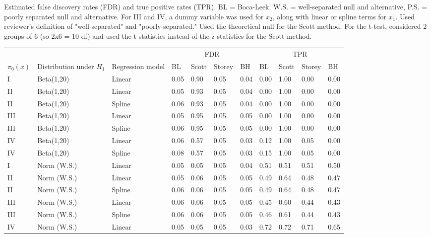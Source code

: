 \documentclass{article}\usepackage[]{graphicx}\usepackage[]{color}
\begin{document}
  
  Estimated false discovery rates (FDR) and true positive rates (TPR). BL = Boca-Leek. W.S. = well-separated null and alternative, P.S. = poorly separated null and alternative. For III and IV, a dummy variable was used for $x_{2}$, along with linear or spline terms for $x_1$. Used reviewer's definition of "well-separated" and "poorly-separated." Used the theoretical null for the Scott method. For the t-test, considered 2 groups of 6 (so 2x6 = 10 df) and used the t-statistics instead of the z-statistics for the Scott method.
\begin{table}[ht]
\centering
\begin{tabular}{lll|llll|llll}
  \hline
  &&& \multicolumn{4}{c}{FDR} & \multicolumn{4}{c}{TPR}\\
 $\pi_0(x)$ &  Distribution under $H_1$ & Regression model & BL & Scott & Storey & BH & BL & Scott & Storey & BH    \\
 \hline
I & Beta(1,20) & Linear & 0.05 & 0.90 & 0.05 & 0.04 & 0.00 & 1.00 & 0.00 & 0.00 \\ 
  II & Beta(1,20) & Linear & 0.05 & 0.93 & 0.05 & 0.04 & 0.00 & 1.00 & 0.00 & 0.00 \\ 
  II & Beta(1,20) & Spline & 0.06 & 0.93 & 0.05 & 0.04 & 0.00 & 1.00 & 0.00 & 0.00 \\ 
  III & Beta(1,20) & Linear & 0.05 & 0.95 & 0.05 & 0.05 & 0.00 & 1.00 & 0.00 & 0.00 \\ 
  III & Beta(1,20) & Spline & 0.06 & 0.95 & 0.05 & 0.05 & 0.00 & 1.00 & 0.00 & 0.00 \\ 
  IV & Beta(1,20) & Linear & 0.06 & 0.57 & 0.05 & 0.03 & 0.12 & 1.00 & 0.05 & 0.00 \\ 
  IV & Beta(1,20) & Spline & 0.08 & 0.57 & 0.05 & 0.03 & 0.15 & 1.00 & 0.05 & 0.00 \\ 
   \hline
I & Norm (W.S.) & Linear & 0.05 & 0.05 & 0.05 & 0.04 & 0.51 & 0.51 & 0.51 & 0.50 \\ 
  II & Norm (W.S.) & Linear & 0.05 & 0.06 & 0.05 & 0.05 & 0.49 & 0.64 & 0.48 & 0.47 \\ 
  II & Norm (W.S.) & Spline & 0.06 & 0.06 & 0.05 & 0.05 & 0.49 & 0.64 & 0.48 & 0.47 \\ 
  III & Norm (W.S.) & Linear & 0.06 & 0.06 & 0.05 & 0.05 & 0.45 & 0.60 & 0.44 & 0.43 \\ 
  III & Norm (W.S.) & Spline & 0.06 & 0.06 & 0.05 & 0.05 & 0.46 & 0.61 & 0.44 & 0.43 \\ 
  IV & Norm (W.S.) & Linear & 0.05 & 0.05 & 0.05 & 0.03 & 0.72 & 0.72 & 0.71 & 0.65 \\ 

\end{tabular}
\end{table}
\end{document}

